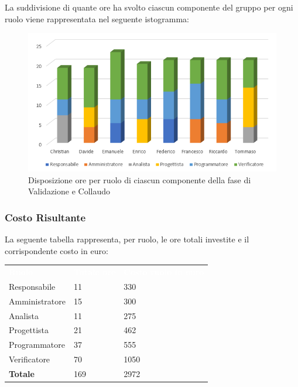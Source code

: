 La suddivisione di quante ore ha svolto ciascun componente del gruppo per ogni ruolo viene rappresentata nel seguente istogramma:

\begin{figure}[h!]
	\centering
	\caption{Disposizione ore per ruolo di ciascun componente della fase di Validazione e Collaudo}
	\includegraphics[scale=2.5]{sezioni/Istogrammi/IstogrammaValidazione.png}
\end{figure}

\subsubsection{Costo Risultante}
La seguente tabella rappresenta, per ruolo, le ore totali investite e il corrispondente costo in euro:
{
	\renewcommand{\arraystretch}{2}
	\centering
\begin{table}[h!]
	\caption{Tabella del costo risultante di Validazione e Collaudo}
	\begin{longtable}	{ C{3cm} C{2cm} C{4cm}}
		\textcolor{white}{\textbf{Ruolo}} & \textcolor{white}{\textbf{Totale ore}} & \textcolor{white}{\textbf{Costo ruolo in euro}}\\	
        
        Responsabile & 11 & 330\\
        Amministratore & 15 & 300 \\
        Analista & 11 & 275\\
        Progettista & 21 & 462\\
        Programmatore & 37 & 555\\
        Verificatore & 70 & 1050\\
        \textbf{Totale} & 169 & 2972\
	
	\end{longtable}
\end{table}
	
}


